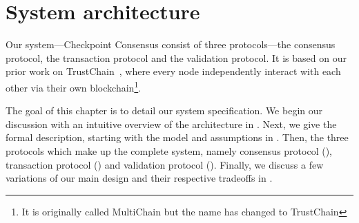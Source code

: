 \chapter{System architecture}
\label{ch:model}






Our system---Checkpoint Consensus consist of three protocols---the consensus protocol, the transaction protocol and the validation protocol.
It is based on our prior work on TrustChain~\cite{multichain},
where every node independently interact with each other via their own blockchain\footnote{It is originally called MultiChain but the name has changed to TrustChain}.

The goal of this chapter is to detail our system specification.
We begin our discussion with an intuitive overview of the architecture in .
Next, we give the formal description, starting with the model and assumptions in .
Then, the three protocols which make up the complete system,
namely consensus protocol (), transaction protocol () and validation protocol ().
Finally, we discuss a few variations of our main design and their respective tradeoffs in .


